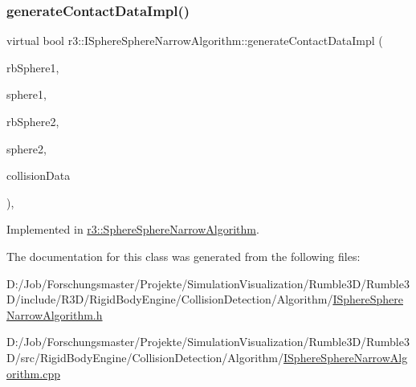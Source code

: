 \mbox{\label{classr3_1_1_i_sphere_sphere_narrow_algorithm_a9e616d04c7ee379d973ec81ea0067cc3}} 
\subsubsection{\texorpdfstring{generate\+Contact\+Data\+Impl()}{generateContactDataImpl()}}
{\footnotesize\ttfamily virtual bool r3\+::\+I\+Sphere\+Sphere\+Narrow\+Algorithm\+::generate\+Contact\+Data\+Impl (\begin{DoxyParamCaption}\item[{\mbox{\hyperlink{classr3_1_1_rigid_body}{Rigid\+Body}} $\ast$}]{rb\+Sphere1,  }\item[{\mbox{\hyperlink{classr3_1_1_collision_sphere}{Collision\+Sphere}} $\ast$}]{sphere1,  }\item[{\mbox{\hyperlink{classr3_1_1_rigid_body}{Rigid\+Body}} $\ast$}]{rb\+Sphere2,  }\item[{\mbox{\hyperlink{classr3_1_1_collision_sphere}{Collision\+Sphere}} $\ast$}]{sphere2,  }\item[{\mbox{\hyperlink{classr3_1_1_collision_data}{Collision\+Data}} \&}]{collision\+Data }\end{DoxyParamCaption})\hspace{0.3cm}{\ttfamily [protected]}, {}}



Implemented in \mbox{\hyperlink{classr3_1_1_sphere_sphere_narrow_algorithm_a3559238de013b2fb8f3786e365e2ace7}{r3\+::\+Sphere\+Sphere\+Narrow\+Algorithm}}.



The documentation for this class was generated from the following files\+:\begin{DoxyCompactItemize}
\item 
D\+:/\+Job/\+Forschungsmaster/\+Projekte/\+Simulation\+Visualization/\+Rumble3\+D/\+Rumble3\+D/include/\+R3\+D/\+Rigid\+Body\+Engine/\+Collision\+Detection/\+Algorithm/\mbox{\hyperlink{_i_sphere_sphere_narrow_algorithm_8h}{I\+Sphere\+Sphere\+Narrow\+Algorithm.\+h}}\item 
D\+:/\+Job/\+Forschungsmaster/\+Projekte/\+Simulation\+Visualization/\+Rumble3\+D/\+Rumble3\+D/src/\+Rigid\+Body\+Engine/\+Collision\+Detection/\+Algorithm/\mbox{\hyperlink{_i_sphere_sphere_narrow_algorithm_8cpp}{I\+Sphere\+Sphere\+Narrow\+Algorithm.\+cpp}}\end{DoxyCompactItemize}
